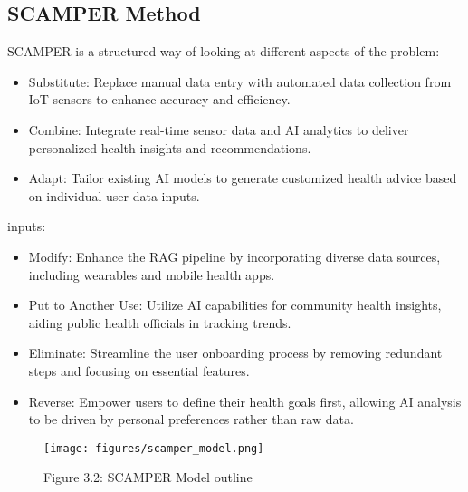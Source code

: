 \subsection{SCAMPER Method}
SCAMPER is a structured way of looking at different aspects of the problem:
\begin{itemize}
    \item Substitute: Replace manual data entry with automated data collection from IoT sensors to enhance accuracy and efficiency.
    \item Combine: Integrate real-time sensor data and AI analytics to deliver personalized health insights and recommendations.
    \item Adapt: Tailor existing AI models to generate customized health advice based on individual user data inputs.
\end{itemize}

inputs:
\begin{itemize}
    \item Modify: Enhance the RAG pipeline by incorporating diverse data sources, including wearables and mobile health apps.
    \item Put to Another Use: Utilize AI capabilities for community health insights, aiding public health officials in tracking trends.
    \item Eliminate: Streamline the user onboarding process by removing redundant steps and focusing on essential features.
    \item Reverse: Empower users to define their health goals first, allowing AI analysis to be driven by personal preferences rather than raw data.
\end{itemize}

\begin{figure}[H]
    \centering
    \texttt{[image: figures/scamper\_model.png]}
    \caption{Figure 3.2: SCAMPER Model outline}
\end{figure}

